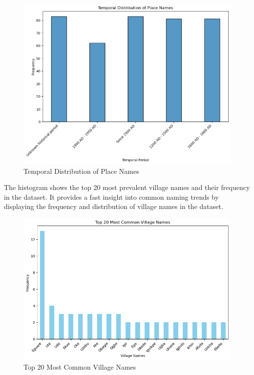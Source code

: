 \begin{figure}
    \centering
    \includegraphics[width=1\linewidth]{output2.png}
    \caption{Temporal Distribution of Place Names}
    \label{fig:histgram}
\end{figure}
\newpage

The histogram shows the top 20 most prevalent village names and their frequency in the dataset. It provides a fast insight into common naming trends by displaying the frequency and distribution of village names in the dataset.

\begin{figure}
    \centering
    \includegraphics[width=1\linewidth]{histogram2.png}
    \caption{Top 20 Most Common Village Names}
    \label{fig:histogram2}
\end{figure}
\newpage


